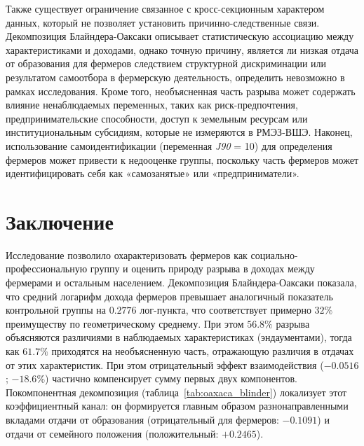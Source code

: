 \documentclass[14pt, a4paper]{article}
\begin{document}
	Также существует ограничение связанное с кросс-секционным характером данных, который не позволяет установить причинно-следственные связи. Декомпозиция Блайндера-Оаксаки описывает статистическую ассоциацию между характеристиками и доходами, однако точную причину, является ли низкая отдача от образования для фермеров следствием структурной дискриминации или результатом самоотбора в фермерскую деятельность, определить невозможно в рамках исследования. Кроме того, необъясненная часть разрыва может содержать влияние ненаблюдаемых переменных, таких как риск-предпочтения, предпринимательские способности, доступ к земельным ресурсам или институциональным субсидиям, которые не измеряются в РМЭЗ-ВШЭ. Наконец, использование самоидентификации (переменная \textit{J90} = 10) для определения фермеров может привести к недооценке группы, поскольку часть фермеров может идентифицировать себя как «самозанятые» или «предприниматели».
	
	\section{Заключение}\label{sec:conclusion}
	

	
	
	
	Исследование позволило охарактеризовать фермеров как социально-профессиональную группу и оценить природу разрыва в доходах между фермерами и остальным населением. Декомпозиция Блайндера-Оаксаки показала, что средний логарифм дохода фермеров превышает аналогичный показатель контрольной группы на \(0.2776\) лог-пункта, что соответствует примерно \(32\%\) преимуществу по геометрическому среднему. При этом \(56.8\%\) разрыва объясняются различиями в наблюдаемых характеристиках (эндаументами), тогда как \(61.7\%\) приходятся на необъясненную часть, отражающую различия в отдачах от этих характеристик. При этом отрицательный эффект взаимодействия (\(-0.0516\); \(-18.6\%\)) частично компенсирует сумму первых двух компонентов. Покомпонентная декомпозиция (таблица~\ref{tab:oaxaca_blinder}) локализует этот коэффициентный канал: он формируется главным образом разнонаправленными вкладами отдачи от образования (отрицательный для фермеров: \(-0.1091\)) и отдачи от семейного положения (положительный: \(+0.2465\)).
	
\end{document}
